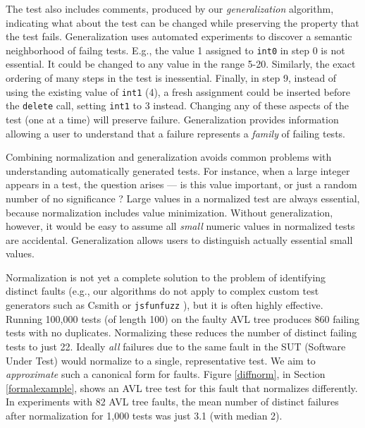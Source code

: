 The test also includes comments, produced by our
\emph{generalization} \cite{SmartCheck} algorithm, indicating what
about the test can be changed while preserving the property that
the test fails.  Generalization uses automated experiments to discover
a semantic neighborhood of failng tests.  E.g.,
the value 1 assigned to {\tt int0} in step 0 is not essential.  It
could be changed to any value in the range 5-20.  Similarly, the exact ordering of many steps in the test
is inessential.  Finally, in step 9, instead of using the existing
value of {\tt int1} (4), a fresh assignment could be inserted before
the {\tt delete} call, setting {\tt int1} to 3 instead.  Changing any
of these aspects of the test (one at a time)
will preserve failure.  Generalization provides information allowing
a user to understand that a failure represents  a
\emph{family} of failing tests.

Combining normalization and generalization avoids common problems
with understanding automatically generated tests.  For instance,
when a large integer appears in a test, the question
arises --- is this value important, or just a random number of
no significance \cite{MakeMost}?  Large
values in a normalized test are always essential, because normalization includes value minimization.
Without generalization, however, it would be
easy to assume all \emph{small} numeric values in normalized
tests are accidental.  Generalization allows users to
distinguish actually essential small values.

Normalization is not yet a complete solution to the problem of identifying
distinct faults (e.g., our algorithms do not apply to complex custom
test generators such as Csmith \cite{csmith} or {\tt jsfunfuzz}
\cite{jsfunfuzz}), but it is often highly effective.  Running 100,000
tests (of length 100) on the faulty AVL tree produces 860 failing tests with no duplicates.  Normalizing these reduces the number of
distinct failing tests to just 22.  Ideally \emph{all} failures
due to the same fault in the SUT (Software Under Test) would normalize
to a single, representative test.  We aim to
\emph{approximate} such a canonical form for faults.  Figure \ref{diffnorm},
in Section \ref{formalexample}, shows an AVL tree test for this fault that
normalizes differently.  
 In experiments with 82 AVL tree faults,
the mean number of distinct failures after normalization for 1,000
tests was just 3.1 (with median 2). 

